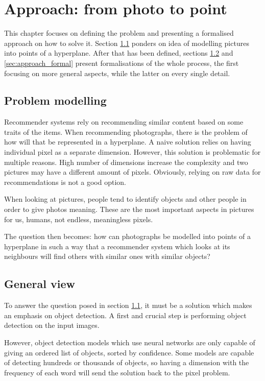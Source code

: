 \chapter{Approach: from photo to point}
\label {chap:approach}

This chapter focuses on defining the problem and presenting a formalised approach on how to solve it. Section \ref{sec:approach_modelling} ponders on idea of modelling pictures into points of a hyperplane. After that has been defined, sections \ref{sec:approach_general} and \ref{sec:approach_formal} present formalisations of the whole process, the first focusing on more general aspects, while the latter on every single detail.

\section{Problem modelling}
\label{sec:approach_modelling}

Recommender systems rely on recommending similar content based on some traits of the items. When recommending photographs, there is the problem of how will that be represented in a hyperplane. A naive solution relies on having individual pixel as a separate dimension. However, this solution is problematic for multiple reasons. High number of dimensions increase the complexity and two pictures may have a different amount of pixels. Obviously, relying on raw data for recommendations is not a good option.

When looking at pictures, people tend to identify objects and other people in order to give photos meaning. These are the most important aspects in pictures for us, humans, not endless, meaningless pixels. 

The question then becomes: how can photographs be modelled into points of a hyperplane in such a way that a recommender system which looks at its neighbours will find others with similar ones with similar objects? 

\section{General view}
\label{sec:approach_general}

To answer the question posed in section \ref{sec:approach_modelling}, it must be a solution which makes an emphasis on object detection. A first and crucial step is performing object detection on the input images.

However, object detection models which use neural networks are only capable of giving an ordered list of objects, sorted by confidence. Some models are capable of detecting hundreds or thousands of objects, so having a dimension with the frequency of each word will send the solution back to the pixel problem. 

